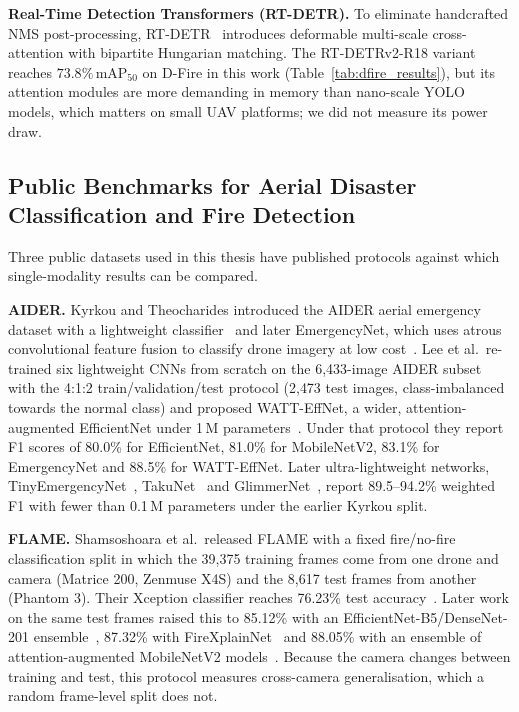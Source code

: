 \textbf{Real-Time Detection Transformers (RT-DETR).}
To eliminate handcrafted NMS post-processing, RT-DETR~\cite{zhao2024rtdetr} introduces deformable multi-scale cross-attention with bipartite Hungarian matching. The RT-DETRv2-R18 variant reaches $73.8\%\, \text{mAP}_{50}$ on D-Fire in this work (Table~\ref{tab:dfire_results}), but its attention modules are more demanding in memory than nano-scale YOLO models, which matters on small UAV platforms; we did not measure its power draw.

\subsection{Public Benchmarks for Aerial Disaster Classification and Fire Detection}
\label{sec:public_benchmarks_related}

Three public datasets used in this thesis have published protocols against which single-modality results can be compared.

\textbf{AIDER.} Kyrkou and Theocharides introduced the AIDER aerial emergency dataset with a lightweight classifier~\cite{kyrkou2019aider} and later EmergencyNet, which uses atrous convolutional feature fusion to classify drone imagery at low cost~\cite{kyrkou2020emergencynet}. Lee et al.\ re-trained six lightweight CNNs from scratch on the 6{,}433-image AIDER subset with the 4:1:2 train/validation/test protocol (2{,}473 test images, class-imbalanced towards the normal class) and proposed WATT-EffNet, a wider, attention-augmented EfficientNet under 1\,M parameters~\cite{lee2023wattefnet}. Under that protocol they report F1 scores of 80.0\% for EfficientNet, 81.0\% for MobileNetV2, 83.1\% for EmergencyNet and 88.5\% for WATT-EffNet. Later ultra-lightweight networks, TinyEmergencyNet~\cite{mogaka2024tinyemergencynet}, TakuNet~\cite{rossi2025takunet} and GlimmerNet~\cite{nedeljkovic2025glimmernet}, report 89.5--94.2\% weighted F1 with fewer than 0.1\,M parameters under the earlier Kyrkou split.

\textbf{FLAME.} Shamsoshoara et al.\ released FLAME with a fixed fire/no-fire classification split in which the 39{,}375 training frames come from one drone and camera (Matrice 200, Zenmuse X4S) and the 8{,}617 test frames from another (Phantom 3). Their Xception classifier reaches 76.23\% test accuracy~\cite{shamsoshoara2021aerial}. Later work on the same test frames raised this to 85.12\% with an EfficientNet-B5/DenseNet-201 ensemble~\cite{ghali2022uavwildfire}, 87.32\% with FireXplainNet~\cite{khan2024firexplainnet} and 88.05\% with an ensemble of attention-augmented MobileNetV2 models~\cite{deng2025lightweight}. Because the camera changes between training and test, this protocol measures cross-camera generalisation, which a random frame-level split does not.

